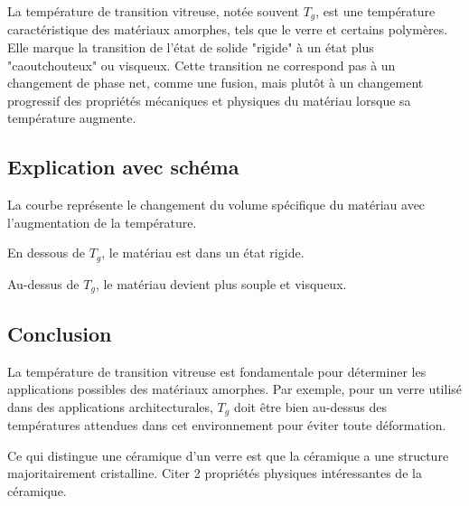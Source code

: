 \documentclass[answers]{exam}
\begin{document}
\begin{questions}
\begin{solution}
La température de transition vitreuse, notée souvent \( T_g \), est une température caractéristique des matériaux amorphes, tels que le verre et certains polymères. Elle marque la transition de l'état de solide "rigide" à un état plus "caoutchouteux" ou visqueux. Cette transition ne correspond pas à un changement de phase net, comme une fusion, mais plutôt à un changement progressif des propriétés mécaniques et physiques du matériau lorsque sa température augmente.

\subsection*{Explication avec schéma}

\begin{center}
\end{center}

\begin{addmargin}[2em]{1em}
  \begin{compactitem}
      \item La courbe représente le changement du volume spécifique du matériau avec l'augmentation de la température. 
      \item En dessous de \( T_g \), le matériau est dans un état rigide.
      \item Au-dessus de \( T_g \), le matériau devient plus souple et visqueux.
  \end{compactitem}
\end{addmargin}

\subsection*{Conclusion}

La température de transition vitreuse est fondamentale pour déterminer les applications possibles des matériaux amorphes. Par exemple, pour un verre utilisé dans des applications architecturales, \( T_g \) doit être bien au-dessus des températures attendues dans cet environnement pour éviter toute déformation.
\end{solution}

\question[1] Ce qui distingue une céramique d'un verre est que la céramique a une structure majoritairement cristalline. Citer 2 propriétés physiques intéressantes de la céramique.

\end{questions}
\end{document}
